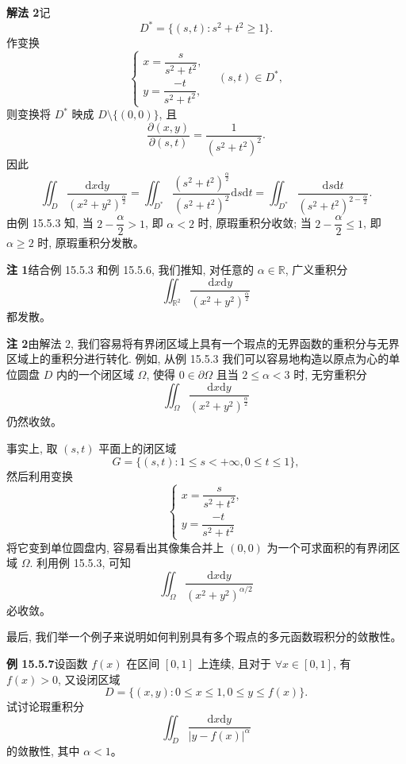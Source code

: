 \documentclass[UTF8,12pt,a4paper,fontset=fandol]{ctexart}
\begin{document}
\noindent\textbf{解法 2}\quad 记
\[
  D^*=\{(s,t):s^2+t^2\geqslant1\}.
\]
作变换
\[
  \begin{cases}
    x=\dfrac{s}{s^2+t^2},\\
    y=\dfrac{-t}{s^2+t^2},
  \end{cases}
  \quad(s,t)\in D^*,
\]
则变换将 $D^*$ 映成 $D\setminus\{(0,0)\}$, 且
\[
  \frac{\partial(x,y)}{\partial(s,t)}=\frac1{(s^2+t^2)^2}.
\]
因此
\[
  \iint_D\frac{\mathrm dx\mathrm dy}{(x^2+y^2)^{\frac\alpha2}}
  =\iint_{D^*}\frac{(s^2+t^2)^{\frac\alpha2}}{(s^2+t^2)^2}\mathrm ds\mathrm dt
  =\iint_{D^*}\frac{\mathrm ds\mathrm dt}{(s^2+t^2)^{2-\frac\alpha2}}.
\]
由例 15.5.3 知, 当 $2-\dfrac\alpha2>1$, 即 $\alpha<2$ 时, 原瑕重积分收敛; 当 $2-\dfrac\alpha2\leqslant1$, 即 $\alpha\geqslant2$ 时, 原瑕重积分发散。

\noindent\textbf{注 1}\quad 结合例 15.5.3 和例 15.5.6, 我们推知, 对任意的 $\alpha\in\mathbb R$, 广义重积分
\[
  \iint_{\mathbb R^2}\frac{\mathrm dx\mathrm dy}{(x^2+y^2)^{\frac\alpha2}}
\]
都发散。

\noindent\textbf{注 2}\quad 由解法 2, 我们容易将有界闭区域上具有一个瑕点的无界函数的重积分与无界区域上的重积分进行转化. 例如, 从例 15.5.3 我们可以容易地构造以原点为心的单位圆盘 $D$ 内的一个闭区域 $\Omega$, 使得 $0\in\partial\Omega$ 且当 $2\leqslant\alpha<3$ 时, 无穷重积分
\[
  \iint_\Omega\frac{\mathrm dx\mathrm dy}{(x^2+y^2)^{\frac\alpha2}}
\]
仍然收敛。

事实上, 取 $(s,t)$ 平面上的闭区域
\[
  G=\{(s,t):1\leqslant s<+\infty,0\leqslant t\leqslant1\},
\]
然后利用变换
\[
  \begin{cases}
    x=\dfrac{s}{s^2+t^2},\\
    y=\dfrac{-t}{s^2+t^2}
  \end{cases}
\]
将它变到单位圆盘内, 容易看出其像集合并上 $(0,0)$ 为一个可求面积的有界闭区域 $\Omega$. 利用例 15.5.3, 可知
\[
  \iint_\Omega\frac{\mathrm dx\mathrm dy}{(x^2+y^2)^{\alpha/2}}
\]
必收敛。

最后, 我们举一个例子来说明如何判别具有多个瑕点的多元函数瑕积分的敛散性。

\noindent\textbf{例 15.5.7}\quad 设函数 $f(x)$ 在区间 $[0,1]$ 上连续, 且对于 $\forall x\in[0,1]$, 有 $f(x)>0$, 又设闭区域
\[
  D=\{(x,y):0\leqslant x\leqslant1,0\leqslant y\leqslant f(x)\}.
\]
试讨论瑕重积分
\[
  \iint_D\frac{\mathrm dx\mathrm dy}{|y-f(x)|^\alpha}
\]
的敛散性, 其中 $\alpha<1$。
\end{document}
